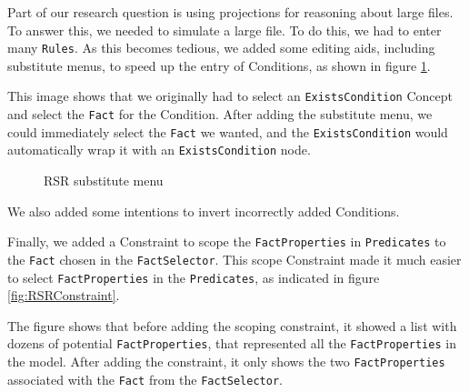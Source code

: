 Part of our research question is using projections for reasoning about large files.
To answer this, we needed to simulate a large file.
To do this, we had to enter many \texttt{Rules}.
As this becomes tedious, we added some editing aids, including substitute menus, to speed up the entry of Conditions, as shown in figure \ref{fig:RSRSubstituteMenu}.

This image shows that we originally had to select an \texttt{ExistsCondition} Concept and select the \texttt{Fact} for the Condition.
After adding the substitute menu, we could immediately select the \texttt{Fact} we wanted, and the \texttt{ExistsCondition} would automatically wrap it with an \texttt{ExistsCondition} node.

\begin{figure}[h]
    \centering
    \caption{RSR substitute menu}
    \label{fig:RSRSubstituteMenu}
\end{figure}

We also added some intentions to invert incorrectly added Conditions.

Finally, we added a Constraint to scope the \texttt{FactProperties} in \texttt{Predicates} to the \texttt{Fact} chosen in the \texttt{FactSelector}.
This scope Constraint made it much easier to select \texttt{FactProperties} in the \texttt{Predicates}, as indicated in figure \ref{fig:RSRConstraint}.

The figure shows that before adding the scoping constraint, it showed a list with dozens of potential \texttt{FactProperties}, that represented all the \texttt{FactProperties} in the model.
After adding the constraint, it only shows the two \texttt{FactProperties} associated with the \texttt{Fact} from the \texttt{FactSelector}.

